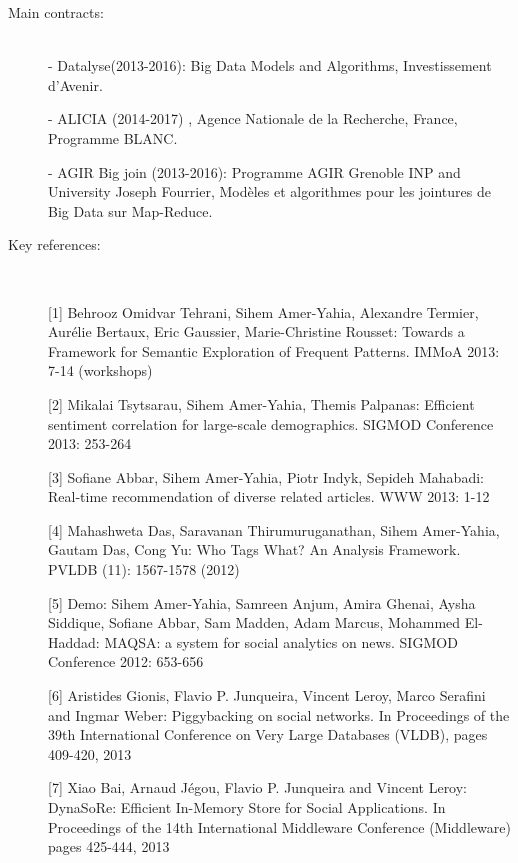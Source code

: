 \begin{description}

\item[Main contracts:]  \ \\
- Datalyse(2013-2016): Big Data Models and Algorithms, Investissement d'Avenir.

- ALICIA (2014-2017) , Agence Nationale de la Recherche, France, Programme BLANC. 

- AGIR Big join (2013-2016): Programme AGIR Grenoble INP and  University Joseph Fourrier,  Mod{\`e}les et algorithmes pour les jointures de Big Data sur Map-Reduce. 
  
\item[Key references:]
~%

[1]   Behrooz Omidvar Tehrani, Sihem Amer-Yahia, Alexandre Termier, Aur{\'e}lie Bertaux, Eric Gaussier, Marie-Christine Rousset: Towards a Framework for Semantic Exploration of Frequent Patterns. IMMoA 2013: 7-14 (workshops) 

[2]  Mikalai Tsytsarau, Sihem Amer-Yahia, Themis Palpanas: Efficient sentiment correlation for large-scale demographics. SIGMOD Conference 2013: 253-264

[3]  Sofiane Abbar, Sihem Amer-Yahia, Piotr Indyk, Sepideh Mahabadi: Real-time recommendation of diverse related articles. WWW 2013: 1-12

[4]  Mahashweta Das, Saravanan Thirumuruganathan, Sihem Amer-Yahia, Gautam Das, Cong Yu: Who Tags What? An Analysis Framework. PVLDB (11): 1567-1578 (2012)

[5]  Demo: Sihem Amer-Yahia, Samreen Anjum, Amira Ghenai, Aysha Siddique, Sofiane Abbar, Sam Madden, Adam Marcus, Mohammed El-Haddad: MAQSA: a system for social analytics on news. SIGMOD Conference 2012: 653-656

[6] Aristides Gionis, Flavio P. Junqueira, Vincent Leroy, Marco Serafini and Ingmar Weber: Piggybacking on social networks. In Proceedings of the 39th International Conference on Very Large Databases (VLDB), pages 409-420, 2013

[7]  Xiao Bai, Arnaud J{\'e}gou, Flavio P. Junqueira and Vincent Leroy:  DynaSoRe: Efficient In-Memory Store for Social Applications. In Proceedings of the 14th International Middleware Conference (Middleware)  pages 425-444, 2013

\end{description}

